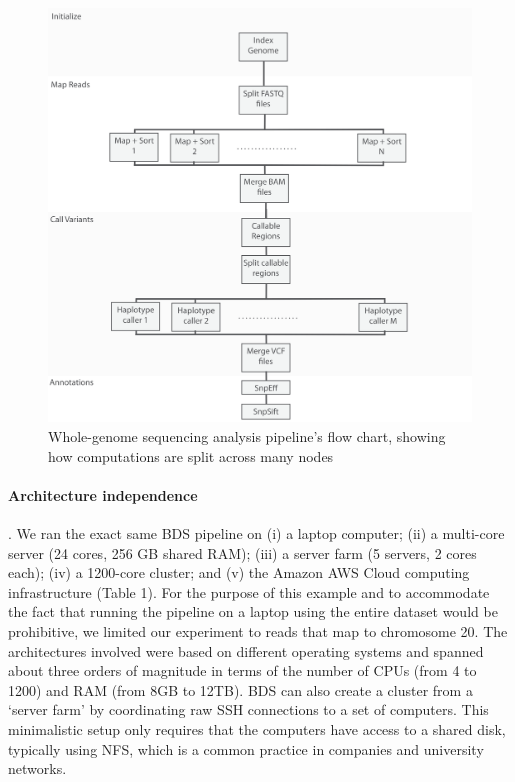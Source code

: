 \begin{figure}
    \centering
    \includegraphics[width=12cm]{bds_figure_2_small.png}
    \caption{Whole-genome sequencing analysis pipeline’s flow chart, showing how computations are split across many nodes}
    \label{fig:bdsexec}
\end{figure}

\paragraph{Architecture independence}. We ran the exact same BDS pipeline on (i) a laptop computer; (ii) a multi-core server (24 cores, 256 GB shared RAM); (iii) a server farm (5 servers, 2 cores each); (iv) a 1200-core cluster; and (v) the Amazon AWS Cloud computing infrastructure (Table 1). For the purpose of this example and to accommodate the fact that running the pipeline on a laptop using the entire dataset would be prohibitive, we limited our experiment to reads that map to chromosome 20. The architectures involved were based on different operating systems and spanned about three orders of magnitude in terms of the number of CPUs (from 4 to 1200) and RAM (from 8GB to 12TB). BDS can also create a cluster from a ‘server farm’ by coordinating raw SSH connections to a set of computers. This minimalistic setup only requires that the computers have access to a shared disk, typically using NFS, which is a common practice in companies and university networks.

